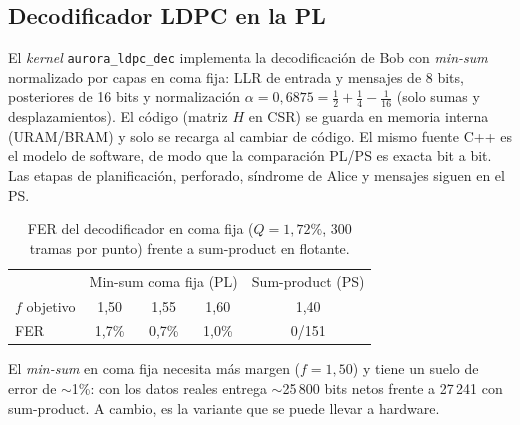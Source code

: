 \documentclass[a4paper,11pt]{article}
\newcommand{\code}[1]{\texttt{#1}}
\begin{document}
\begin{table}[htbp]
\centering
\caption{Cadena autenticada sobre los 40\,755 bits cribados reales (PC).}
\end{table}

\subsection{Decodificador LDPC en la PL}
El \emph{kernel} \code{aurora\_ldpc\_dec} implementa la decodificación de Bob con \emph{min-sum} normalizado
por capas en coma fija: LLR de entrada y mensajes de 8 bits, posteriores de 16 bits y normalización
$\alpha = 0{,}6875 = \tfrac12+\tfrac14-\tfrac1{16}$ (solo sumas y desplazamientos). El código (matriz $H$
en CSR) se guarda en memoria interna (URAM/BRAM) y solo se recarga al cambiar de código. El mismo fuente
C++ es el modelo de software, de modo que la comparación PL/PS es exacta bit a bit. Las etapas de
planificación, perforado, síndrome de Alice y mensajes siguen en el PS.

\begin{table}[htbp]
\centering
\caption{FER del decodificador en coma fija ($Q = 1{,}72\%$, 300 tramas por punto) frente a sum-product en flotante.}
\begin{tabular}{lcccc}
\toprule
& \multicolumn{3}{c}{Min-sum coma fija (PL)} & Sum-product (PS) \\
$f$ objetivo & 1,50 & 1,55 & 1,60 & 1,40 \\
\midrule
FER & 1,7\% & 0,7\% & 1,0\% & 0/151 \\
\bottomrule
\end{tabular}
\end{table}

\noindent
El \emph{min-sum} en coma fija necesita más margen ($f = 1{,}50$) y tiene un suelo de error de $\sim$1\%:
con los datos reales entrega $\sim$25\,800 bits netos frente a 27\,241 con sum-product. A cambio, es la
variante que se puede llevar a hardware.
\end{document}
